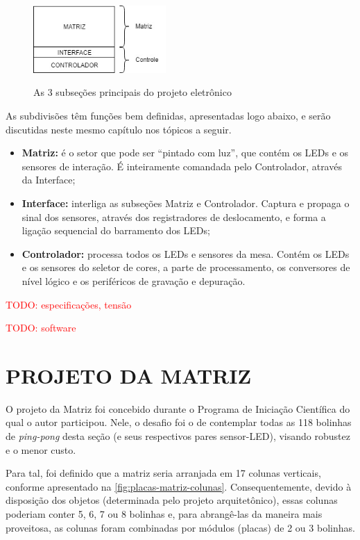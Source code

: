 \begin{figure}[H]
    \centering
    \caption{As 3 subseções principais do projeto eletrônico}
    \includegraphics[width=0.45\textwidth]{./dados/figuras/secoes}
    \label{fig:subsecoes}
\end{figure}

As subdivisões têm funções bem definidas, apresentadas logo abaixo, e serão discutidas neste mesmo capítulo nos tópicos a seguir.

\begin{itemize}
    \item \textbf{Matriz:} é o setor que pode ser ``pintado com luz'', que contém os LEDs e os sensores de interação. É inteiramente comandada pelo Controlador, através da Interface;
    \item \textbf{Interface:} interliga as subseções Matriz e Controlador. Captura e propaga o sinal dos sensores, através dos registradores de deslocamento, e forma a ligação sequencial do barramento dos LEDs;
    \item \textbf{Controlador:} processa todos os LEDs e sensores da mesa. Contém os LEDs e os sensores do seletor de cores, a parte de processamento, os conversores de nível lógico e os periféricos de gravação e depuração.
\end{itemize}

\textcolor{red}{TODO: especificações, tensão}

\textcolor{red}{TODO: software}

\section{PROJETO DA MATRIZ}
\label{sec:matriz}

O projeto da Matriz foi concebido durante o Programa de Iniciação Científica do qual o autor participou. Nele, o desafio foi o de contemplar todas as 118 bolinhas de \emph{ping-pong} desta seção (e seus respectivos pares sensor-LED), visando robustez e o menor custo.

Para tal, foi definido que a matriz seria arranjada em 17 colunas verticais, conforme apresentado na \autoref{fig:placas-matriz-colunas}. Consequentemente, devido à disposição dos objetos (determinada pelo projeto arquitetônico), essas colunas poderiam conter 5, 6, 7 ou 8 bolinhas e, para abrangê-las da maneira mais proveitosa, as colunas foram combinadas por módulos (placas) de 2 ou 3 bolinhas.

